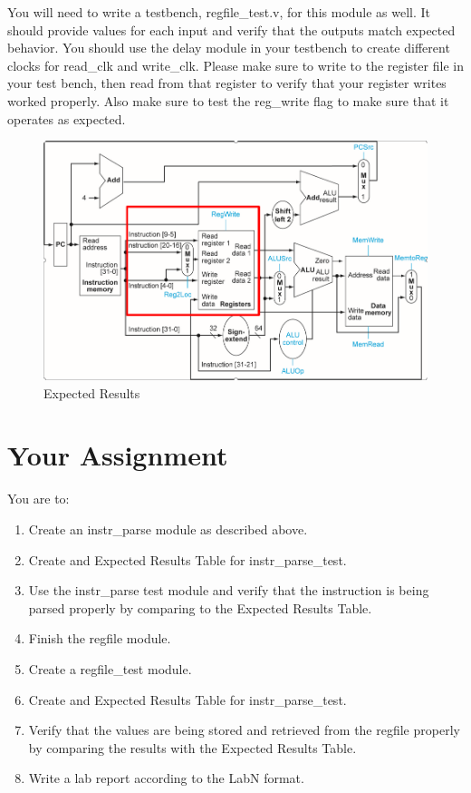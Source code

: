 You will need to write a testbench, regfile\_test.v, for this module as well.  It should provide values for each input and verify that the outputs match expected behavior.  You should use the delay module in your testbench to create different clocks for read\_clk and write\_clk.  Please make sure to write to the register file in your test bench, then read from that register to verify that your register writes worked properly.  Also make sure to test the reg\_write flag to make sure that it operates as expected.

\begin{figure}
	\caption{Expected Results}\label{fig:register_file_cutout}
	\begin{center}
		\includegraphics[width=4.75in]{../images/register_file_cutout.png}
	\end{center}
\end{figure} 


\clearpage
\section{Your Assignment}

You are to:
\begin{enumerate}
\item Create an instr\_parse module as described above.
\item Create and Expected Results Table for instr\_parse\_test.
\item Use the instr\_parse test module and verify that the instruction is being parsed properly by comparing to the Expected Results Table.
\item Finish the regfile module.
\item Create a regfile\_test module.
\item Create and Expected Results Table for instr\_parse\_test.
\item Verify that the values are being stored and retrieved from the regfile properly by comparing the results with the Expected Results Table.
\item Write a lab report according to the LabN format.
\end{enumerate} 